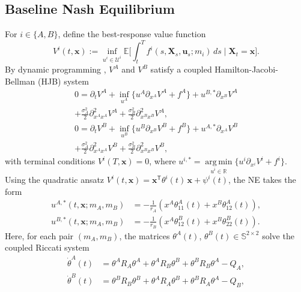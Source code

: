 \documentclass[letterpaper, 10 pt, conference]{ieeeconf}
\DeclareMathOperator*{\argmin}{arg\,min}
\newcommand{\E}{\mathbb E}
\newcommand{\R}{\mathbb R}
\newcommand{\Ss}{\mathbb S}
\newcommand{\transpose}{^\mathsf{T}}
\begin{document}
\subsection{Baseline Nash Equilibrium}\label{subsec:baseline_NE}

\noindent For $i \in \{A,B\}$, define the  best-response value function
\begin{equation*}
    V^i(t,\bm{x}) := \inf\limits_{u^i\in\mathcal{U}^i} \E\Big[\int_t^T f^i(s,\bm{X}_s,\bm{u}_s;m_i)\,ds \mid \bm X_t = \bm x\Big].
\end{equation*}
By dynamic programming \cite[Section~5.1.4]{carmona2016lectures}, $V^A$ and $V^B$ satisfy a coupled Hamilton-Jacobi-Bellman (HJB) system 
\begin{align*}
    0 = \partial_t V^A + \inf_{u^A}\big\{u^A \partial_{x^A} V^A + f^A\big\} + u^{B,\ast} \partial_{x^B} V^A 
    \\ + \tfrac{\sigma_A^2}{2}\partial^2_{x^A x^A}V^A + \tfrac{\sigma_B^2}{2}\partial_{x^B x^B}^2 V^A,\\
    0 = \partial_t V^B + \inf_{u^B}\big\{u^B \partial_{x^B} V^B + f^B\big\} + u^{A,\ast} \partial_{x^A} V^B \\ + \tfrac{\sigma_A^2}{2}\partial^2_{x^A x^A}V^B + \tfrac{\sigma_B^2}{2}\partial_{x^B x^B}^2 V^B,
\end{align*}
with terminal conditions $V^i(T, \bm{x}) = 0$, where $u^{i,\ast} = \argmin\limits_{u^i\in \R}\{u^i \partial_{x^i} V^i + f^i\}$.
Using the quadratic ansatz $V^i(t,\bm{x}) = \bm{x}\transpose \theta^i(t) \, \bm{x}  %
+ \psi^i(t)$, the NE takes the form
\begin{align}
    u^{A,*}(t,\bm{x}; m_A, m_B) &= -\tfrac{1}{r_A}\!\left(x^A \theta_{11}^A(t) + x^B \theta_{12}^A(t) %
    \right), \label{eq:baseline_NE_control_A} \\
    u^{B,*}(t,\bm{x}; m_A, m_B) &= -\tfrac{1}{r_B}\!\left(x^A \theta_{12}^B(t) + x^B \theta_{22}^B(t) 
    \right). \label{eq:baseline_NE_control_B}
\end{align}
Here, for each pair $(m_A, m_B)$, the matrices 
 $\theta^A(t)$, $\theta^B(t) \in \Ss^{2\times 2}$  solve the coupled Riccati system 
\begin{align}\label{eq:Riccati_A}
    \dot{\theta}^A(t) &= \theta^A R_A \theta^A + \theta^A R_B \theta^B + \theta^B R_B \theta^A - Q_A, \\
    \label{eq:Riccati_B}
    \dot{\theta}^B(t) &= \theta^B R_B \theta^B + \theta^A R_A \theta^B + \theta^B R_A \theta^A - Q_B,
\end{align}
\end{document}
